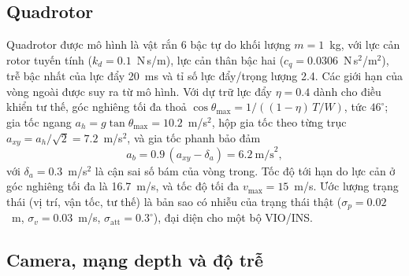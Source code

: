 \documentclass[11pt,a4paper]{article}
\theoremstyle{plain}
\theoremstyle{definition}
\theoremstyle{remark}
\begin{document}
\subsection{Quadrotor}

Quadrotor được mô hình là vật rắn 6 bậc tự do khối lượng $m = 1$~kg, với lực cản rotor tuyến tính ($k_d = 0.1$~N\,s/m), lực cản thân bậc hai ($c_q = 0.0306$~N\,s$^2$/m$^2$), trễ bậc nhất của lực đẩy 20~ms và tỉ số lực đẩy/trọng lượng 2.4. Các giới hạn của vòng ngoài được suy ra từ mô hình. Với dự trữ lực đẩy $\eta = 0.4$ dành cho điều khiển tư thế, góc nghiêng tối đa thoả $\cos\theta_{\max} = 1/((1-\eta)\,T/W)$, tức $46^\circ$; gia tốc ngang $a_h = g\tan\theta_{\max} = 10.2$~m/s$^2$, hộp gia tốc theo từng trục $a_{xy} = a_h/\sqrt{2} = 7.2$~m/s$^2$, và gia tốc phanh bảo đảm
\begin{equation}\label{eq:ab}
a_b = 0.9\,(a_{xy} - \delta_a) = 6.2~\text{m/s}^2,
\end{equation}
với $\delta_a = 0.3$~m/s$^2$ là cận sai số bám của vòng trong. Tốc độ tới hạn do lực cản ở góc nghiêng tối đa là 16.7~m/s, và tốc độ tối đa $v_{\max} = 15$~m/s. Ước lượng trạng thái (vị trí, vận tốc, tư thế) là bản sao có nhiễu của trạng thái thật ($\sigma_p = 0.02$~m, $\sigma_v = 0.03$~m/s, $\sigma_{\mathrm{att}} = 0.3^\circ$), đại diện cho một bộ VIO/INS.

\subsection{Camera, mạng depth và độ trễ}\label{sec:camera}
\end{document}

